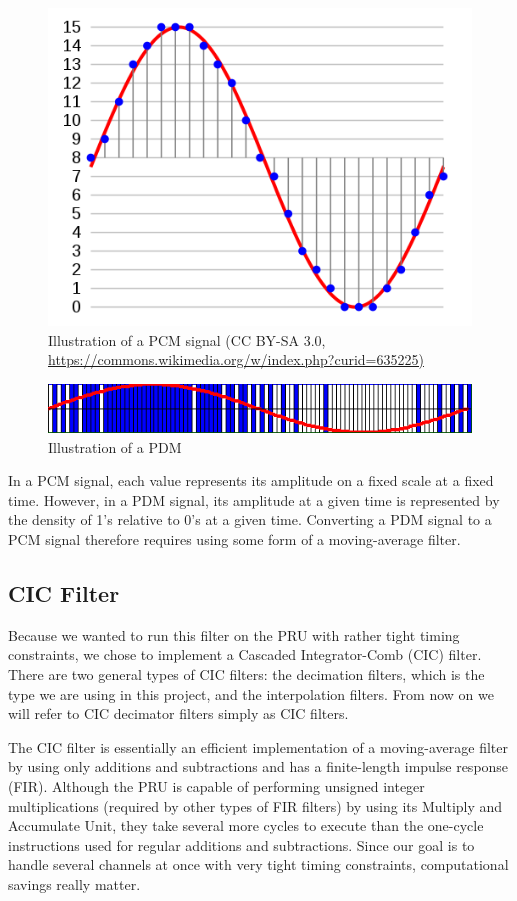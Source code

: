 \documentclass[]{report}
\begin{document}
\begin{figure}[H]
\centering
\includegraphics[width=0.7\linewidth]{Pictures/PCM.png}
\caption{Illustration of a PCM signal (CC BY-SA 3.0, \url{https://commons.wikimedia.org/w/index.php?curid=635225)}}
\end{figure}

\begin{figure}[H]
\centering
\includegraphics[width=1.0\linewidth]{Pictures/PDM.png}
\caption{Illustration of a PDM}
\end{figure}

In a PCM signal, each value represents its amplitude on a fixed scale at a fixed time. However, in a PDM signal, its amplitude at a given time is represented by the density of 1's relative to 0's at a given time. Converting a PDM signal to a PCM signal therefore requires using some form of a moving-average filter.

\hypertarget{cic-filter}{%
\subsection{CIC Filter}\label{cic-filter}}

Because we wanted to run this filter on the PRU with rather tight timing constraints, we chose to implement a Cascaded Integrator-Comb (CIC) filter. There are two general types of CIC filters: the decimation filters, which is the type we are using in this project, and the interpolation filters. From now on we will refer to CIC decimator filters simply as CIC filters.

The CIC filter is essentially an efficient implementation of a moving-average filter by using only additions and subtractions and has a finite-length impulse response (FIR). Although the PRU is capable of performing unsigned integer multiplications (required by other types of FIR filters) by using its Multiply and Accumulate Unit, they take several more cycles to execute than the one-cycle instructions used for regular additions and subtractions. Since our goal is to handle several channels at once with very tight timing constraints, computational savings really matter.
\end{document}
